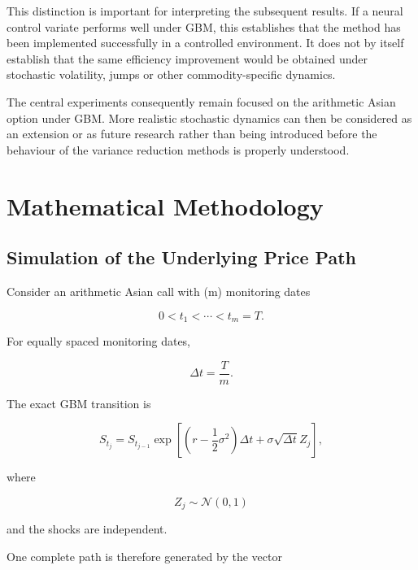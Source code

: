 \documentclass[12pt,a4paper]{report}
\begin{document}
This distinction is important for interpreting the subsequent results. If a neural control variate performs well under GBM, this establishes that the method has been implemented successfully in a controlled environment. It does not by itself establish that the same efficiency improvement would be obtained under stochastic volatility, jumps or other commodity-specific dynamics.

The central experiments consequently remain focused on the arithmetic Asian option under GBM. More realistic stochastic dynamics can then be considered as an extension or as future research rather than being introduced before the behaviour of the variance reduction methods is properly understood.


\chapter{Mathematical Methodology}

\section{Simulation of the Underlying Price Path}

Consider an arithmetic Asian call with (m) monitoring dates

\begin{equation}
0<t_1<\cdots<t_m=T.
\end{equation}

For equally spaced monitoring dates,

\begin{equation}
\Delta t
=
\frac{T}{m}.
\end{equation}

The exact GBM transition is

\begin{equation}
S_{t_j}
=
S_{t_{j-1}}
\exp
\left[
\left(
r-\frac{1}{2}\sigma^2
\right)\Delta t
+
\sigma\sqrt{\Delta t}Z_j
\right],
\end{equation}

where

\begin{equation}
Z_j\sim\mathcal{N}(0,1)
\end{equation}

and the shocks are independent.

One complete path is therefore generated by the vector
\end{document}
